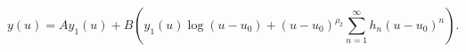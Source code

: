 \begin{equation}
\label{log}
y(u) = A y_1(u) + B \left(y_1(u) \log(u - u_0) 
+ (u-u_0)^{\rho_2} \sum\limits_{n=1}^\infty h_n(u-u_0)^n
\right).
\end{equation}


